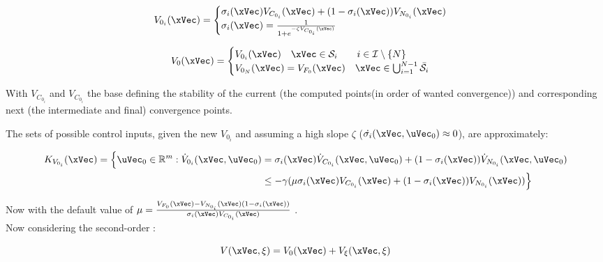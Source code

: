 \begin{align}
    V_{0_i}(\xVec) = 
    \begin{cases}
        \sigma_i(\xVec) V_{C_{0_i}}(\xVec) + (1 - \sigma_i(\xVec))V_{N_{0_i}}(\xVec) \\
        \sigma_i(\xVec) = \frac{1}{1+e^{-\zeta V_{C_{0_i}}(\xVec)}} 
    \end{cases}
    \label{eq:1stPhase_2-CLF-S_multiple_waypoints}
\end{align}

\begin{align}
    V_0(\xVec) = 
    \begin{cases}
        V_{0_i}(\xVec) \quad \xVec \in \mathcal{S}_i \qquad i \in \mathcal{I}\setminus\{N\}\\
        V_{0_N}(\xVec) = V_{F_0}(\xVec) \quad \xVec \in \bigcup_{i = 1}^{N-1} \bar{\mathcal{S}}_i
    \end{cases}
    \label{eq:New_2-CLF-S_multiple_waypoints}
\end{align}


With \(V_{C_{0_i}}\) and \(V_{C_{0_i}}\) the base  defining the stability of the current (the computed points(in order of wanted convergence)) and corresponding next (the intermediate and final) convergence points. \par
The sets of possible control inputs, given the new  \(V_{0_i}\) and assuming a high slope \(\zeta\) (\(\dot{\sigma_i}(\xVec, \uVec_0)\approx 0\)),  are approximately:

\begin{align}
    K_{V_{0_i}}(\xVec) = \Bigl\{\uVec_0 \in \mathbb{R}^m: \dot{V}_{0_i}(\xVec, \uVec_0) &= \sigma_i(\xVec) \dot{V}_{C_{0_i}}(\xVec, \uVec_0)  + (1-\sigma_i(\xVec))\dot{V}_{N_{0_i}}(\xVec, \uVec_0) \notag \\
    &\leq -\gamma( \mu \sigma_i(\xVec) V_{C_{0_i}}(\xVec) + (1 - \sigma_i(\xVec))V_{N_{0_i}}(\xVec))\Bigr\}
    \label{eq:2-CLF-S_Constraint_multiple_waypoints}
\end{align}

Now with the default value of \(\mu =\frac{V_{F_{0}}(\xVec)- V_{N_{0_i}}(\xVec)(1 -\sigma_i(\xVec))}{\sigma_i(\xVec) V_{C_{0_i}}(\xVec)} \) .\\


Now considering the second-order :

\begin{equation}
    V(\xVec, \xi) = V_0(\xVec) + V_{\xi}(\xVec, \xi)
    \label{eq:HH_New_2-CLF-S_multiple_waypoints}
\end{equation}



